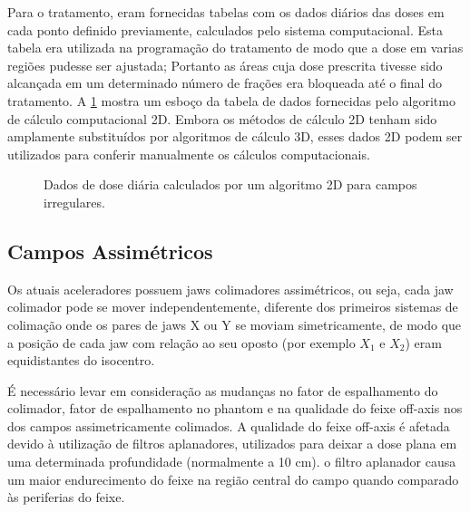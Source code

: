 \documentclass[11pt,a4paper]{article}
\newcounter{exemplo}
\begin{document}
        Para o tratamento, eram fornecidas tabelas com os dados diários das doses em cada ponto definido previamente, calculados pelo sistema computacional. Esta tabela era utilizada na programação do tratamento de modo que a dose em varias regiões pudesse ser ajustada; Portanto as áreas cuja dose prescrita tivesse sido alcançada em um determinado número de frações era bloqueada até o final do tratamento. A \ref{fig:dadoscalc2d} mostra um esboço da tabela de dados fornecidas pelo algoritmo de cálculo computacional 2D. Embora os métodos de cálculo 2D tenham sido amplamente substituídos por algoritmos de cálculo 3D, esses dados 2D podem ser utilizados para conferir manualmente os cálculos computacionais.

        \begin{figure}[h]
            \centering
            \caption{Dados de dose diária calculados por um algoritmo 2D para campos irregulares.}
            \label{fig:dadoscalc2d}
        \end{figure}

    \subsection{Campos Assimétricos}

        Os atuais aceleradores possuem jaws colimadores assimétricos, ou seja, cada jaw colimador pode se mover independentemente, diferente dos primeiros sistemas de colimação onde os pares de jaws X ou Y se moviam simetricamente, de modo que a posição de cada jaw com relação ao seu oposto (por exemplo $X_1$ e $X_2$) eram equidistantes do isocentro. 

        É necessário levar em consideração as mudanças no fator de espalhamento do colimador, fator de espalhamento no phantom e na qualidade do feixe off-axis nos dos campos assimetricamente colimados.  A qualidade do feixe off-axis é afetada devido à utilização de filtros aplanadores, utilizados para deixar a dose plana em uma determinada profundidade (normalmente a 10 cm). o filtro aplanador causa um maior endurecimento do feixe na região central do campo quando comparado às periferias do feixe.
\end{document}
